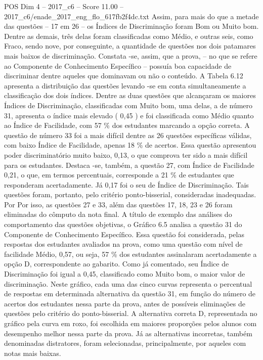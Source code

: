 \begin{textsample}{POS Dim 4 – 2017\_c6 – Score 11.00 – 2017\_c6/enade\_2017\_eng\_flo\_617fb2f4dc.txt}
Assim, para mais do que a metade das questões – 17 em 26 – os Índices de Discriminação foram Bom ou Muito bom.
Dentre as demais, três delas foram classificadas como Médio, e outras seis, como Fraco, sendo nove, por conseguinte, a quantidade de questões nos dois patamares mais baixos de discriminação.
Constata -se, assim, que a prova, – no que se refere ao Componente de Conhecimento Específico – possuía boa capacidade de discriminar dentre aqueles que dominavam ou não o conteúdo.
A Tabela 6.12 apresenta a distribuição das questões levando -se em conta simultaneamente a classificação dos dois índices.
Dentre as duas questões que alcançaram os maiores Índices de Discriminação, classificadas com Muito bom, uma delas, a de número 31, apresenta o índice mais elevado ( 0,45 ) e foi classificada como Médio quanto ao Índice de Facilidade, com 57 \% dos estudantes marcando a opção correta.
A questão de número 33 foi a mais difícil dentre as 26 questões específicas válidas, com baixo Índice de Facilidade, apenas 18 \% de acertos.
Essa questão apresentou poder discriminatório muito baixo, 0,13, o que comprova ter sido a mais difícil para os estudantes.
Destaca -se, também, a questão 27, com Índice de Facilidade 0,21, o que, em termos percentuais, corresponde a 21 \% de estudantes que responderam acertadamente.
Já 0,17 foi o seu de Índice de Discriminação.
Tais questões foram, portanto, pelo critério ponto-bisserial, consideradas inadequadas.
Por Por isso, as questões 27 e 33, além das questões 17, 18, 23 e 26 foram eliminadas do cômputo da nota final.
A título de exemplo das análises do comportamento das questões objetivas, o Gráfico 6.5 analisa a questão 31 do Componente de Conhecimento Específico.
Essa questão foi considerada, pelas respostas dos estudantes avaliados na prova, como uma questão com nível de facilidade Médio, 0,57, ou seja, 57 \% dos estudantes assinalaram acertadamente a opção D, correspondente ao gabarito.
Como já comentado, seu Índice de Discriminação foi igual a 0,45, classificado como Muito bom, o maior valor de discriminação.
Neste gráfico, cada uma das cinco curvas representa o percentual de respostas em determinada alternativa da questão 31, em função do número de acertos dos estudantes nessa parte da prova, antes de possíveis eliminações de questões pelo critério do ponto-bisserial.
A alternativa correta D, representada no gráfico pela curva em roxo, foi escolhida em maiores proporções pelos alunos com desempenho melhor nessa parte da prova.
Já as alternativas incorretas, também denominadas distratores, foram selecionadas, principalmente, por aqueles com notas mais baixas.

\end{textsample}
